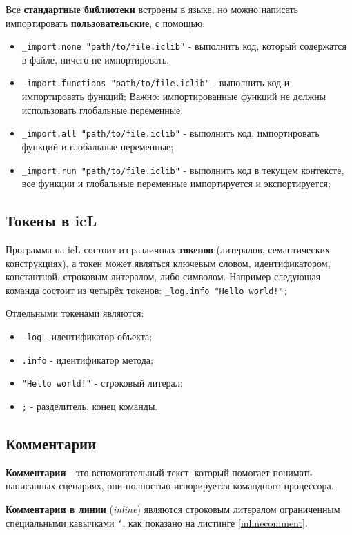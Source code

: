 \documentclass[a4paper, 14pt, russian]{extarticle}
\newenvironment{icItems}
	{ \begin{itemize} [noitemsep,nolistsep] }
	{ \end{itemize} }
\begin{document}
	Все \textbf{стандартные библиотеки} встроены в языке, но можно написать импортировать \textbf{пользовательские}, с помощью:
\begin{icItems}
	\item \lstinline`_import.none "path/to/file.iclib"` - выполнить код, который содержатся в файле, ничего не импортировать.
	\item \lstinline`_import.functions "path/to/file.iclib"` - выполнить код и импортировать функций; {\color{red}Важно:} импортированные функций не должны использовать глобальные переменные.
	\item \lstinline`_import.all "path/to/file.iclib"` -  выполнить код, импортировать функций и глобальные переменные;
	\item \lstinline`_import.run "path/to/file.iclib"` - выполнить код в текущем контексте, все функции и глобальные переменные импортируется и экспортируется;
\end{icItems}
	
\subsection{Токены в icL}
	
	Программа на icL состоит из различных \textbf{токенов} (литералов, семантических конструкциях), а токен может являться ключевым словом, идентификатором, константной, строковым литералом, либо символом. Например следующая команда состоит из четырёх токенов: \lstinline`_log.info "Hello world!";`
	
	Отдельными токенами являются:
\begin{icItems}
	\item \lstinline`_log` - идентификатор объекта;
	\item \lstinline`.info` - идентификатор метода;
	\item \lstinline`"Hello world!"` - строковый литерал;
	\item \lstinline`;` - разделитель, конец команды.
\end{icItems}
	
\subsection{Комментарии}
	
	\textbf{Комментарии} - это вспомогательный текст, который помогает понимать написанных сценариях, они полностью игнорируется командного процессора. 
	
	\textbf{Комментарии в линии} (\textit{inline}) являются строковым литералом ограниченным специальными кавычками \texttt{`}, как показано на листинге \ref{inlinecomment}.
	
\end{document}
